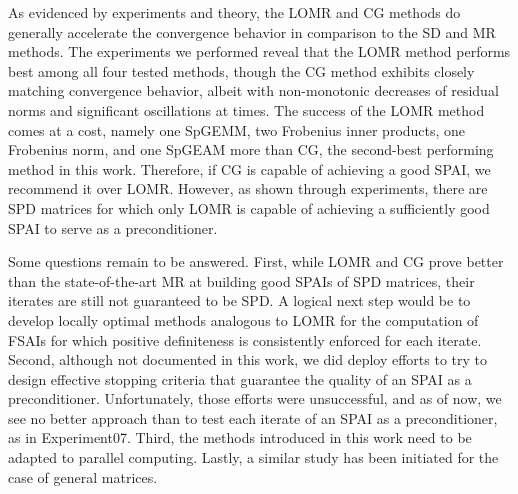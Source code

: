 \documentclass[numbers,webpdf,imanum]{ima-authoring-template}%
\theoremstyle{thmstyletwo}%
\numberwithin{equation}{section}
\begin{document}
As evidenced by experiments and theory, the LOMR and CG methods do generally accelerate the convergence behavior in comparison to the SD and MR methods.
The experiments we performed reveal that the LOMR method performs best among all four tested methods, though the CG method exhibits closely matching convergence behavior, albeit with non-monotonic decreases of residual norms and significant oscillations at times.
The success of the LOMR method comes at a cost, namely one SpGEMM, two Frobenius inner products, one Frobenius norm, and one SpGEAM more than CG, the second-best performing method in this work.
Therefore, if CG is capable of achieving a good SPAI, we recommend it over LOMR.
However, as shown through experiments, there are SPD matrices for which only LOMR is capable of achieving a sufficiently good SPAI to serve as a preconditioner.

Some questions remain to be answered.
First, while LOMR and CG prove better than the state-of-the-art MR at building good SPAIs of SPD matrices, their iterates are still not guaranteed to be SPD.
A logical next step would be to develop locally optimal methods analogous to LOMR for the computation of FSAIs for which positive definiteness is consistently enforced for each iterate.
Second, although not documented in this work, we did deploy efforts to try to design effective stopping criteria that guarantee the quality of an SPAI as a preconditioner. 
Unfortunately, those efforts were unsuccessful, and as of now, we see no better approach than to test each iterate of an SPAI as a preconditioner, as in Experiment07.
Third, the methods introduced in this work need to be adapted to parallel computing.
Lastly, a similar study has been initiated for the case of general matrices.

 


\appendix
\end{document}
